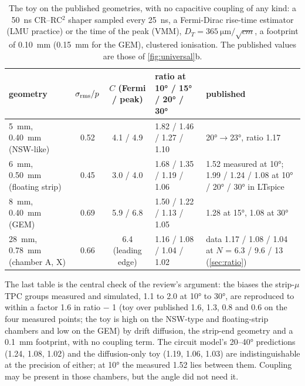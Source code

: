 \begin{table}[h]
  \centering\footnotesize
  \caption{The toy on the published geometries, with no capacitive coupling of any kind: a 50~ns CR--RC$^2$ shaper sampled every
  25~ns, a Fermi-Dirac rise-time estimator (LMU practice) or the time of the peak (VMM), $D_T = \SI{365}{\micro\metre\per\sqrt{cm}}$, a
  footprint of 0.10~mm (0.15~mm for the GEM), clustered ionisation. The published values are those of \cref{fig:universal}b.}
  \label{tab:toydet}
  \begin{tabular}{@{}p{3.1cm}ccp{3.3cm}p{5.0cm}@{}}
    \toprule
    geometry & $\sigma_{\rm rms}/p$ & $C$ (Fermi / peak) & ratio at \ang{10} / \ang{15} / \ang{20} / \ang{30} & published \\
    \midrule
    5~mm, 0.40~mm (NSW-like) & 0.52 & 4.1 / 4.9 & 1.82 / 1.46 / 1.27 / 1.10 & \ang{20}$\to$\ang{23}, ratio 1.17~\cite{Iodice2015} \\
    6~mm, 0.50~mm (floating strip) & 0.45 & 3.0 / 4.0 & 1.68 / 1.35 / 1.19 / 1.06 & 1.52 measured at \ang{10}; 1.99 / 1.24 / 1.08 at \ang{10} / \ang{20} / \ang{30} in LTspice~\cite{Bortfeldt2014} \\
    8~mm, 0.40~mm (GEM) & 0.69 & 5.9 / 6.8 & 1.50 / 1.22 / 1.13 / 1.05 & 1.28 at \ang{15}, 1.08 at \ang{30}~\cite{Flierl2018} \\
    28~mm, 0.78~mm (chamber A, X) & 0.66 & 6.4 (leading edge) & 1.16 / 1.08 / 1.04 / 1.02 & data 1.17 / 1.08 / 1.04 at $N$ = 6.3 / 9.6 / 13 (\cref{sec:ratio}) \\
    \bottomrule
  \end{tabular}
\end{table}

The last table is the central check of the review's argument: the biases the strip-$\mu$TPC groups measured and simulated,
1.1 to 2.0 at \ang{10} to \ang{30}, are reproduced to within a factor 1.6 in ratio $-$ 1 (toy over published 1.6, 1.3, 0.8 and 0.6
on the four measured points; the toy is high on the NSW-type and floating-strip chambers and low on the GEM) by drift
diffusion, the strip-end geometry and a 0.1~mm footprint, with no coupling term. The circuit model's 20--\ang{40} predictions (1.24, 1.08, 1.02) and the
diffusion-only toy (1.19, 1.06, 1.03) are indistinguishable at the precision of either; at \ang{10} the measured 1.52 lies between
them. Coupling may be present in those chambers, but the angle did not need it.
